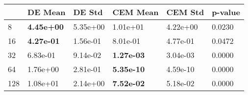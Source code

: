 \begin{tabular}{llllll}
\toprule
{} &            DE Mean &    DE Std &           CEM Mean &   CEM Std & p-value \\
\midrule
8   &  \textbf{4.45e+00} &  5.35e+00 &           1.01e+01 &  4.22e+00 &  0.0230 \\
16  &  \textbf{4.27e-01} &  1.56e-01 &           8.01e-01 &  4.77e-01 &  0.0472 \\
32  &           6.83e-01 &  9.14e-02 &  \textbf{1.27e-03} &  3.04e-03 &  0.0000 \\
64  &           1.76e+00 &  2.81e-01 &  \textbf{5.35e-10} &  4.59e-10 &  0.0000 \\
128 &           1.08e+01 &  2.14e+00 &  \textbf{7.52e-02} &  5.18e-02 &  0.0000 \\
\bottomrule
\end{tabular}
